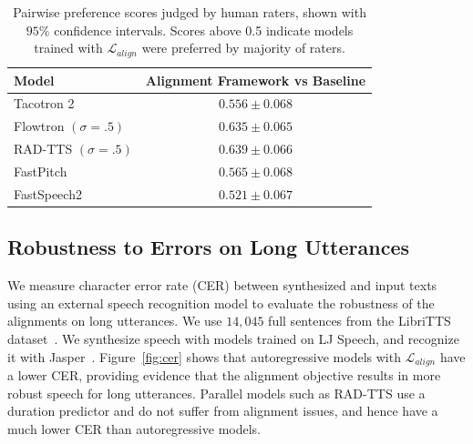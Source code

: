 \begin{table}[!ht]
    \caption{Pairwise preference scores judged by human raters, shown with $95\%$ confidence intervals. Scores above 0.5 indicate models trained with $\mathcal{L}_{\mathit{align}}$ were preferred by majority of raters.}
    \centering
    \begin{tabular}{lc}
        \toprule
        \textbf{Model} & \textbf{ Alignment Framework vs Baseline}\\
        \midrule
        Tacotron 2  & $0.556 \pm 0.068$ \\
        Flowtron $(\sigma = .5)$ & $0.635 \pm 0.065$ \\
        RAD-TTS $(\sigma = .5)$ & $0.639 \pm 0.066$ \\
        FastPitch & $0.565 \pm 0.068$ \\
        FastSpeech2 & $0.521 \pm 0.067$ \\
        \bottomrule
        \end{tabular}
    \vspace{-1.5\baselineskip}
    \label{tab:pairwise_results}
    
\end{table}
\subsection{Robustness to Errors on Long Utterances}
We measure character error rate (CER) between synthesized and input texts using an external speech recognition model to evaluate the robustness of the alignments on long utterances. We use $14,045$ full sentences from the LibriTTS dataset~\cite{libritts}. We synthesize speech with models trained on LJ Speech, and recognize it with Jasper~\cite{li2019jasper}. Figure~\ref{fig:cer} shows that autoregressive models with $\mathcal{L}_{\mathit{align}}$ have a lower CER, providing evidence that the alignment objective results in more robust speech for long utterances. Parallel models such as RAD-TTS use a duration predictor and do not suffer from alignment issues, and hence have a much lower CER than autoregressive models. 


